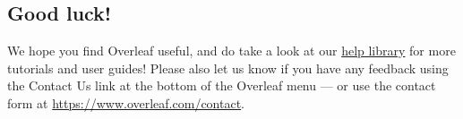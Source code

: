\documentclass{article}
\begin{document}
\subsection{Good luck!}

We hope you find Overleaf useful, and do take a look at our \href{https://www.overleaf.com/learn}{help library} for more tutorials and user guides! Please also let us know if you have any feedback using the Contact Us link at the bottom of the Overleaf menu --- or use the contact form at \url{https://www.overleaf.com/contact}.



\end{document}
